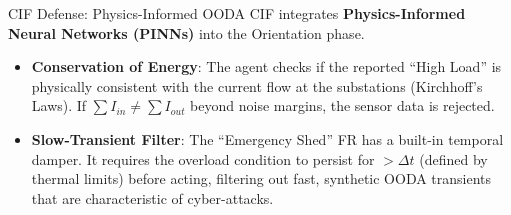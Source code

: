 \documentclass[
  ignorenonframetext,
]{beamer}
\providecommand{\tightlist}{%
  \setlength{\itemsep}{0pt}\setlength{\parskip}{0pt}}
\begin{document}
\begin{frame}{CIF Defense: Physics-Informed OODA}
\protect{}\label{cif-defense-physics-informed-ooda}
CIF integrates \textbf{Physics-Informed Neural Networks (PINNs)} into
the Orientation phase.

\begin{itemize}
\tightlist
\item
  \textbf{Conservation of Energy}: The agent checks if the reported
  ``High Load'' is physically consistent with the current flow at the
  substations (Kirchhoff's Laws). If \(\sum I_{in} \neq \sum I_{out}\)
  beyond noise margins, the sensor data is rejected.
\item
  \textbf{Slow-Transient Filter}: The ``Emergency Shed'' FR has a
  built-in temporal damper. It requires the overload condition to
  persist for \(> \Delta t\) (defined by thermal limits) before acting,
  filtering out fast, synthetic OODA transients that are characteristic
  of cyber-attacks.
\end{itemize}
\end{frame}
\end{document}
